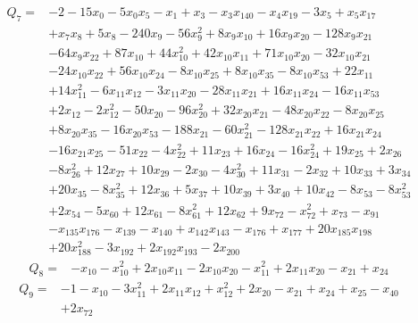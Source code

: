 \begin{equation*}\begin{aligned}
Q_{7}={}& -2-15x_{0}-5x_{0}x_{5}-x_{1}+x_{3}-x_{3}x_{140}-x_{4}x_{19}-3x_{5}+x_{5}x_{17}\\
& +x_{7}x_{8}+5x_{8}-240x_{9}-56x_{9}^{2}+8x_{9}x_{10}+16x_{9}x_{20}-128x_{9}x_{21}\\
& -64x_{9}x_{22}+87x_{10}+44x_{10}^{2}+42x_{10}x_{11}+71x_{10}x_{20}-32x_{10}x_{21}\\
& -24x_{10}x_{22}+56x_{10}x_{24}-8x_{10}x_{25}+8x_{10}x_{35}-8x_{10}x_{53}+22x_{11}\\
& +14x_{11}^{2}-6x_{11}x_{12}-3x_{11}x_{20}-28x_{11}x_{21}+16x_{11}x_{24}-16x_{11}x_{53}\\
& +2x_{12}-2x_{12}^{2}-50x_{20}-96x_{20}^{2}+32x_{20}x_{21}-48x_{20}x_{22}-8x_{20}x_{25}\\
& +8x_{20}x_{35}-16x_{20}x_{53}-188x_{21}-60x_{21}^{2}-128x_{21}x_{22}+16x_{21}x_{24}\\
& -16x_{21}x_{25}-51x_{22}-4x_{22}^{2}+11x_{23}+16x_{24}-16x_{24}^{2}+19x_{25}+2x_{26}\\
& -8x_{26}^{2}+12x_{27}+10x_{29}-2x_{30}-4x_{30}^{2}+11x_{31}-2x_{32}+10x_{33}+3x_{34}\\
& +20x_{35}-8x_{35}^{2}+12x_{36}+5x_{37}+10x_{39}+3x_{40}+10x_{42}-8x_{53}-8x_{53}^{2}\\
& +2x_{54}-5x_{60}+12x_{61}-8x_{61}^{2}+12x_{62}+9x_{72}-x_{72}^{2}+x_{73}-x_{91}\\
& -x_{135}x_{176}-x_{139}-x_{140}+x_{142}x_{143}-x_{176}+x_{177}+20x_{185}x_{198}\\
& +20x_{188}^{2}-3x_{192}+2x_{192}x_{193}-2x_{200}
\end{aligned}\end{equation*}
\begin{equation*}\begin{aligned}
Q_{8}={}& -x_{10}-x_{10}^{2}+2x_{10}x_{11}-2x_{10}x_{20}-x_{11}^{2}+2x_{11}x_{20}-x_{21}+x_{24}
\end{aligned}\end{equation*}
\begin{equation*}\begin{aligned}
Q_{9}={}& -1-x_{10}-3x_{11}^{2}+2x_{11}x_{12}+x_{12}^{2}+2x_{20}-x_{21}+x_{24}+x_{25}-x_{40}\\
& +2x_{72}
\end{aligned}\end{equation*}
